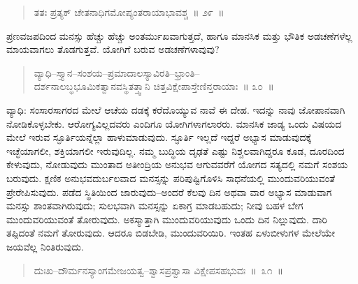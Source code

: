 
\begin{verse}
ತತಃ ಪ್ರತ್ಯಕ್​ ಚೇತನಾಧಿಗಮೋಪ್ಯಂತರಾಯಾಭಾವಶ್ಚ~॥ ೨೯~॥
\end{verse}

\vspace{-0.3cm}


\vskip 0.2cm

ಪ್ರಣವಜಪದಿಂದ ಮನಸ್ಸು ಹೆಚ್ಚು ಹೆಚ್ಚು ಅಂತರ್ಮುಖವಾಗುತ್ತದೆ, ಹಾಗೂ ಮಾನಸಿಕ ಮತ್ತು ಭೌತಿಕ ಅಡಚಣೆಗಳೆಲ್ಲ ಮಾಯವಾಗಲು ತೊಡಗುತ್ತವೆ. ಯೋಗಿಗೆ ಬರುವ ಅಡಚಣೆಗಳಾವುವು?

\vspace{-0.3cm}

\begin{verse}
ವ್ಯಾಧಿ–ಸ್ತ್ಯಾನ–ಸಂಶಯ–ಪ್ರಮಾದಾಲಸ್ಯಾವಿರತಿ–ಭ್ರಾಂತಿ–\\ದರ್ಶನಾಲಬ್ಧಭೂಮಿಕತ್ವಾನವಸ್ಥಿತತ್ತ್ವಾನಿ ಚಿತ್ತವಿಕ್ಷೇಪಾಸ್ತೇಣಿನ್ತರಾಯಾಃ~॥ ೩೦~॥
\end{verse}

\vspace{-0.32cm}


\vspace{0.2cm}

ವ್ಯಾಧಿ: ಸಂಸಾರಸಾಗರದ ಮೇಲೆ ಆಚೆಯ ದಡಕ್ಕೆ ಕರೆದೊಯ್ಯುವ ನಾವೆ ಈ ದೇಹ. ಇದನ್ನು ನಾವು ಜೋಪಾನವಾಗಿ ನೋಡಿಕೊಳ್ಳಬೇಕು. ಆರೋಗ್ಯವಿಲ್ಲದವರು ಎಂದಿಗೂ ಯೋಗಿಗಳಾಗಲಾರರು. ಮಾನಸಿಕ ಜಾಡ್ಯ ಒಂದು ವಿಷಯದ ಮೇಲೆ ಇರುವ ಸ್ಫೂರ್ತಿಯನ್ನೆಲ್ಲಾ ಹಾಳುಮಾಡುವುದು. ಸ್ಫೂರ್ತಿ ಇಲ್ಲದೆ ಇದ್ದರೆ ಅಭ್ಯಾಸ ಮಾಡುವುದಕ್ಕೆ ಇಚ್ಛೆಯಾಗಲೀ, ಶಕ್ತಿಯಾಗಲೀ ಇರುವುದಿಲ್ಲ. ನಮ್ಮ ಬುದ್ಧಿಯ ದೃಢತೆ ಎಷ್ಟು ನಿಶ್ಚಲವಾಗಿದ್ದರೂ ಕೂಡ, ದೂರದಿಂದ ಕೇಳುವುದು, ನೋಡುವುದು ಮುಂತಾದ ಅತೀಂದ್ರಿಯ ಅನುಭವ ಆಗುವವರೆಗೆ ಯೋಗದ ಸತ್ಯದಲ್ಲಿ ನಮಗೆ ಸಂಶಯ ಬರುವುದು. ಕ್ಷಣಿಕ ಅನುಭವ\break ದುರ್ಬಲವಾದ ಮನಸ್ಸನ್ನು ಪರಿಪುಷ್ಟಿಗೊಳಿಸಿ ಸಾಧನೆಯಲ್ಲಿ ಮುಂದುವರಿಯುವಂತೆ ಪ್ರೇರೇಪಿಸುವುದು. ಪಡೆದ ಸ್ಥಿತಿಯಿಂದ ಜಾರುವುದು–ಅಂದರೆ ಕೆಲವು ದಿನ ಅಥವಾ ವಾರ ಅಭ್ಯಾಸ ಮಾಡುವಾಗ ಮನಸ್ಸು ಶಾಂತವಾಗಿರುವುದು; ಸುಲಭವಾಗಿ ಮನಸ್ಸನ್ನು ಏಕಾಗ್ರ ಮಾಡಬಹುದು; ನೀವು ಬಹಳ ಬೇಗ ಮುಂದುವರಿಯುವಂತೆ ತೋರುವುದು. ಅಕಸ್ಮಾತ್ತಾಗಿ ಮುಂದುವರಿಯುವುದು ಒಂದು ದಿನ ನಿಲ್ಲುವುದು. ದಾರಿ ತಪ್ಪಿದಂತೆ ನಮಗೆ ತೋರುವುದು. ಆದರೂ ಬಿಡಬೇಡಿ, ಮುಂದುವರಿಯಿರಿ. ಇಂತಹ ಏಳುಬೀಳುಗಳ ಮೇಲೆಯೇ ಜಯವೆಲ್ಲ ನಿಂತಿರುವುದು. 

\vspace{-0.3cm}

\begin{verse}
ದುಃಖ–ದೌರ್ಮನಸ್ಯಾಂಗಮೇಜಯತ್ವ–ಶ್ವಾಸಪ್ರಶ್ವಾಸಾ ವಿಕ್ಷೇಪಸಹಭುವಃ~॥~೩೧~॥
\end{verse}

